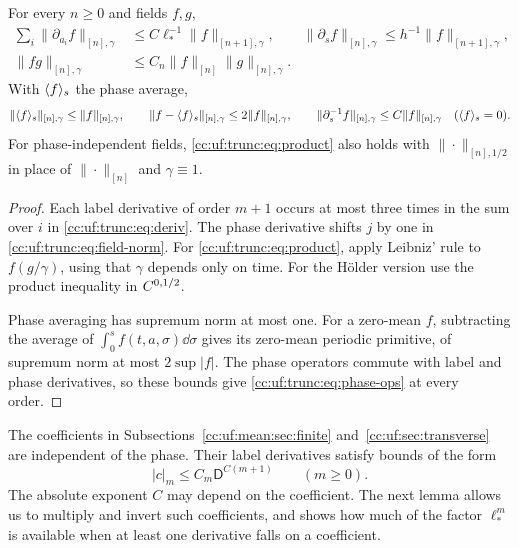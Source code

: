 \begin{lemma}\label{cc:uf:trunc:lem:fields}
For every $n\ge0$ and fields $f,g$,
\begin{align}
 \sum_i\|\partial_{a_i}f\|_{[n],\gamma}
 &\le C\ell_*^{-1}\|f\|_{[n+1],\gamma},\qquad
 \|\partial_sf\|_{[n],\gamma}
 \le h^{-1}\|f\|_{[n+1],\gamma},
 \label{cc:uf:trunc:eq:deriv}\\
 \|fg\|_{[n],\gamma}
 &\le C_n\|f\|_{[n]}\|g\|_{[n],\gamma}.
 \label{cc:uf:trunc:eq:product}
\end{align}
With $\langle f\rangle_s$ the phase average,
\begin{equation}\label{cc:uf:trunc:eq:phase-ops}
 \|\langle f\rangle_s\|_{[n],\gamma}\le\|f\|_{[n],\gamma},\qquad
 \|f-\langle f\rangle_s\|_{[n],\gamma}\le2\|f\|_{[n],\gamma},\qquad
 \|\partial_s^{-1}f\|_{[n],\gamma}\le C\|f\|_{[n],\gamma}
 \quad(\langle f\rangle_s=0).
\end{equation}
For phase-independent fields,
\eqref{cc:uf:trunc:eq:product} also holds with
$\|\cdot\|_{[n],1/2}$ in place of $\|\cdot\|_{[n]}$ and
$\gamma\equiv1$.
\end{lemma}
\begin{proof}
Each label derivative of order $m+1$ occurs at most three times in the
sum over $i$ in \eqref{cc:uf:trunc:eq:deriv}. The phase derivative
shifts $j$ by one in \eqref{cc:uf:trunc:eq:field-norm}. For
\eqref{cc:uf:trunc:eq:product}, apply Leibniz' rule to $f(g/\gamma)$,
using that $\gamma$ depends only on time. For the H\"older version use
the product inequality in $C^{0,1/2}$.

Phase averaging has supremum norm at most one. For a zero-mean $f$,
subtracting the average of $\int_0^s f(t,a,\sigma)\dd\sigma$ gives its
zero-mean periodic primitive, of supremum norm at most $2\sup|f|$.
The phase operators commute with label and phase derivatives, so these
bounds give \eqref{cc:uf:trunc:eq:phase-ops} at every order.
\end{proof}

The coefficients in Subsections~\ref{cc:uf:mean:sec:finite}
and~\ref{cc:uf:sec:transverse} are independent of the phase. Their
label derivatives satisfy bounds of the form
\begin{equation}\label{cc:uf:trunc:eq:power}
 |c|_m\le C_m\mathsf D^{C(m+1)}\qquad(m\ge0).
\end{equation}
The absolute exponent $C$ may depend on the coefficient.
The next lemma allows us to multiply and invert such coefficients,
and shows how much of the factor $\ell_*^m$ is available when at
least one derivative falls on a coefficient.

